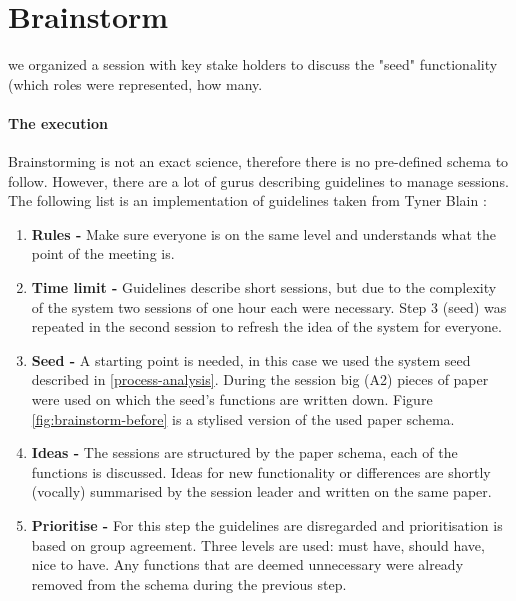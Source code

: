 \section{Brainstorm}
\label{brainstorm}

we organized a session with key stake holders to discuss the "seed" functionality (which roles were represented, how many.

\paragraph{The execution}
Brainstorming is not an exact science, therefore there is no pre-defined schema to follow.
However, there are a lot of gurus describing guidelines to manage sessions.
The following list is an implementation of guidelines taken from Tyner Blain \cite{brainstormWebsite}:


\begin{enumerate}
	\item \textbf{Rules -} Make sure everyone is on the same level and understands what the point of the meeting is. 
	\item \textbf{Time limit -} Guidelines describe short sessions, but due to the complexity of the system two sessions of one hour each were necessary.
		Step 3 (seed) was repeated in the second session to refresh the idea of the system for everyone.
	\item \textbf{Seed -} A starting point is needed, in this case we used the system seed described in \ref{process-analysis}.
		During the session big (A2) pieces of paper were used on which the seed's functions are written down. Figure \ref{fig:brainstorm-before} is a stylised version of the used paper schema.
	\item \textbf{Ideas -} The sessions are structured by the paper schema, each of the functions is discussed.
		Ideas for new functionality or differences are shortly (vocally) summarised by the session leader  and written on the same paper.
	\item \textbf{Prioritise -} For this step the guidelines are disregarded and prioritisation is based on group agreement.
		Three levels are used: must have, should have, nice to have.
		Any functions that are deemed unnecessary were already removed from the schema during the previous step. 
\end{enumerate}


